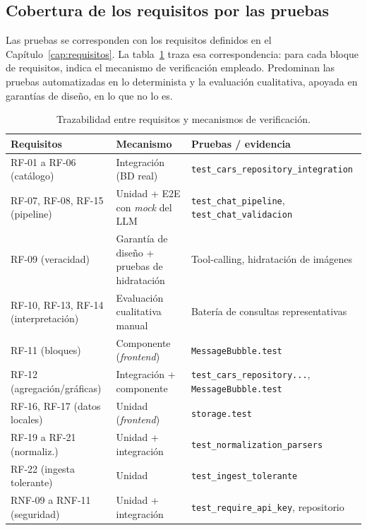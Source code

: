 \subsection{Cobertura de los requisitos por las pruebas}
\label{sec:test-trazabilidad}

Las pruebas se corresponden con los requisitos definidos en el
Capítulo~\ref{cap:requisitos}. La tabla~\ref{tab:trazabilidad-pruebas} traza esa
correspondencia: para cada bloque de requisitos, indica el mecanismo de
verificación empleado. Predominan las pruebas automatizadas en lo determinista y
la evaluación cualitativa, apoyada en garantías de diseño, en lo que no lo es.

\begin{table}[H]
\centering
\renewcommand{\arraystretch}{1.25}
\begin{tabular}{p{3.4cm}p{4.0cm}p{4.8cm}}
\hline
\textbf{Requisitos} & \textbf{Mecanismo} & \textbf{Pruebas / evidencia} \\
\hline
RF-01 a RF-06 (catálogo) & Integración (BD real) &
\texttt{test\_cars\_repository\_integration} \\
RF-07, RF-08, RF-15 (pipeline) & Unidad + E2E con \emph{mock} del LLM &
\texttt{test\_chat\_pipeline}, \texttt{test\_chat\_validacion} \\
RF-09 (veracidad) & Garantía de diseño + pruebas de hidratación &
Tool-calling, hidratación de imágenes \\
RF-10, RF-13, RF-14 (interpretación) & Evaluación cualitativa manual &
Batería de consultas representativas \\
RF-11 (bloques) & Componente (\emph{frontend}) &
\texttt{MessageBubble.test} \\
RF-12 (agregación/gráficas) & Integración + componente &
\texttt{test\_cars\_repository...}, \texttt{MessageBubble.test} \\
RF-16, RF-17 (datos locales) & Unidad (\emph{frontend}) &
\texttt{storage.test} \\
RF-19 a RF-21 (normaliz.) & Unidad + integración &
\texttt{test\_normalization\_parsers} \\
RF-22 (ingesta tolerante) & Unidad &
\texttt{test\_ingest\_tolerante} \\
RNF-09 a RNF-11 (seguridad) & Unidad + integración &
\texttt{test\_require\_api\_key}, repositorio \\
\hline
\end{tabular}
\caption{Trazabilidad entre requisitos y mecanismos de verificación.}
\label{tab:trazabilidad-pruebas}
\end{table}

